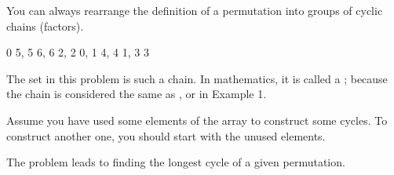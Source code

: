 \documentclass[letterpaper,12pt,english]{book}
\begin{document}
\sphinxAtStartPar
You can always rearrange the definition of a permutation into groups of cyclic chains (factors).

\begin{sphinxVerbatim}[commandchars=\\\{\}]
0 \PYGZhy{}\PYGZgt{} 5, 5 \PYGZhy{}\PYGZgt{} 6, 6 \PYGZhy{}\PYGZgt{} 2, 2 \PYGZhy{}\PYGZgt{} 0,
1 \PYGZhy{}\PYGZgt{} 4, 4 \PYGZhy{}\PYGZgt{} 1,
3 \PYGZhy{}\PYGZgt{} 3
\end{sphinxVerbatim}

\sphinxAtStartPar
The set  in this problem is such a chain. In mathematics, it is called a ; because the chain  is considered the same as ,  or  in Example 1.

\sphinxAtStartPar
Assume you have used some elements of the array  to construct some cycles. To construct another one, you should start with the unused elements.

\sphinxAtStartPar
The problem leads to finding the longest cycle of a given permutation.
\end{document}
